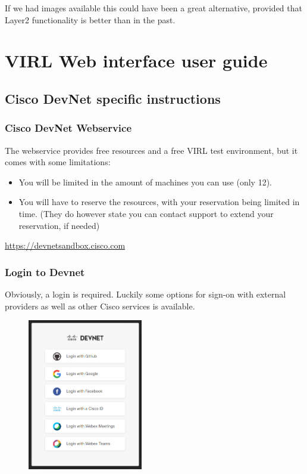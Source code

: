 \documentclass{article}
\begin{document}
If we had images available this could have been a great alternative,
provided that Layer2 functionality is better than in the past.

\newpage
\section{VIRL Web interface user guide}
\subsection{Cisco DevNet specific instructions}
\subsubsection{Cisco DevNet Webservice}
The webservice provides free resources and a free VIRL test environment,
but it comes with some limitations:
\begin{itemize}
	\item You will be limited in the amount of machines you can use (only 12).
	\item You will have to reserve the resources, with your reservation being limited in time.
		(They do however state you can contact support to extend your reservation, if needed)
\end{itemize}

\url{https://devnetsandbox.cisco.com}

\subsubsection{Login to Devnet}
Obviously, a login is required.
Luckily some options for sign-on with external providers as well as other Cisco services is available.
\begin{figure}[H]
	\centering
	\includegraphics[height=250px]{images/login_to_devnet.png}
\end{figure}
\end{document}
